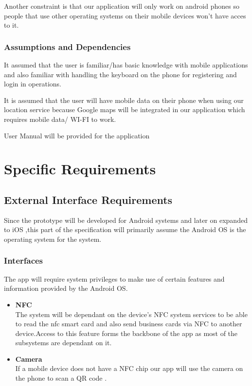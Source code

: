 \documentclass[english]{article}
\begin{document}
                                Another constraint is that our application will only work on android phones so people that use other                                     operating systems on their mobile devices won't have acces to it.  
				
				\subsubsection{Assumptions and Dependencies}
				
				 It assumed that the user is familiar/has basic knowledge with mobile applications  and also familiar                                    with handling the keyboard on the phone for registering and login in operations.

                                 It is assumed that the user will have mobile data on their phone when using our location service                                        because Google maps will be integrated in our application which requires mobile data/ WI-FI to work.

                                 User Manual will be provided for the application 
		
		\newpage

	\section{Specific Requirements}
				\subsection{External Interface Requirements}
						Since the prototype will  be developed for Android systems and later on expanded to iOS ,this part of the specification will 		                                                primarily assume the Android OS is the operating system for the system.
						\subsubsection{Interfaces} 
					         The app will require system privileges to make use of certain features and information provided by the Android OS.
						 \begin{itemize}
							      \item \textbf{NFC}\\
					        The system will be dependant on the device's NFC system services to be able to read the nfc smart card and also send                              business cards via NFC to another device.Access to this feature forms the backbone of the app as most of the subsystems are dependant on it.
								\item \textbf{Camera}\\
						If a mobile device does not have a NFC chip our app will use the camera on the phone to scan a QR code .
						\end{itemize}
\end{document}
